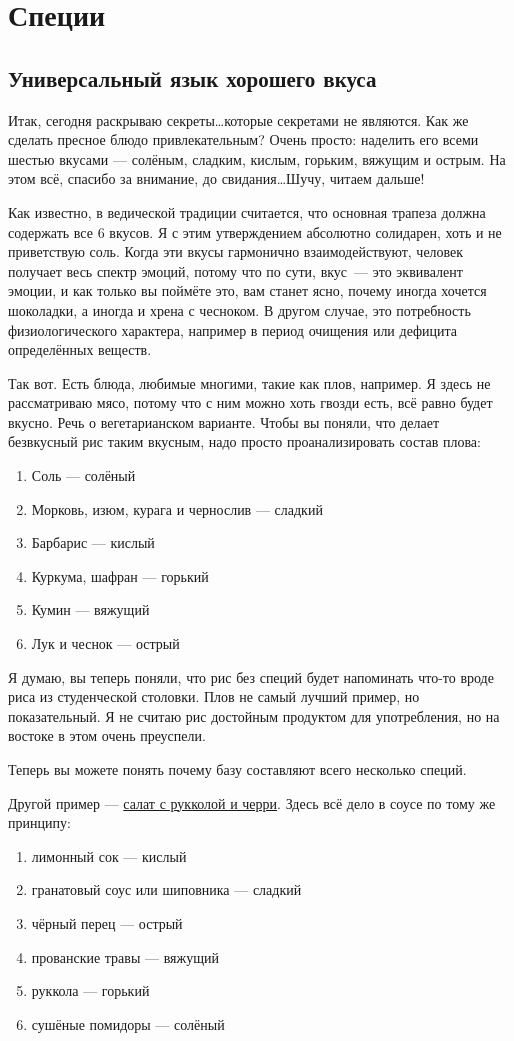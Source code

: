 \chapter{Специи}
\section{Универсальный язык хорошего вкуса}

Итак, сегодня раскрываю секреты\ldots которые секретами не являются.
Как же сделать пресное блюдо привлекательным? 
Очень просто: наделить его всеми шестью вкусами — солёным, сладким, кислым, горьким, вяжущим и острым. На этом всё, спасибо за внимание, до свидания\ldots Шучу, читаем дальше!

Как известно, в ведической традиции считается, что основная трапеза должна содержать все 6 вкусов. Я с этим утверждением абсолютно солидарен, хоть и не приветствую соль. Когда эти вкусы гармонично взаимодействуют, человек получает весь спектр эмоций, потому что по сути, вкус~--- это эквивалент эмоции, и как только вы поймёте это, вам станет ясно, почему иногда хочется шоколадки, а иногда и хрена с чесноком. В другом случае, это потребность физиологического характера, например в период очищения или дефицита определённых веществ.

Так вот. Есть блюда, любимые многими, такие как плов, например. Я здесь не рассматриваю мясо, потому что с ним можно хоть гвозди есть, всё равно будет вкусно. Речь о вегетарианском варианте. Чтобы вы поняли, что делает безвкусный рис таким вкусным, надо просто проанализировать состав плова:
\begin{enumerate}
\item Соль — солёный
\item Морковь, изюм, курага и чернослив — сладкий
\item Барбарис — кислый
\item Куркума, шафран — горький
\item Кумин — вяжущий
\item Лук и чеснок — острый
\end{enumerate}

Я думаю, вы теперь поняли, что рис без специй будет напоминать что-то вроде риса из студенческой столовки. Плов не самый лучший пример, но показательный. Я не считаю рис достойным продуктом для употребления, но на востоке в этом очень преуспели.

Теперь вы можете понять почему базу составляют всего несколько специй.

Другой пример — \hyperref[arugula]{салат с рукколой и черри}. Здесь всё дело в соусе по тому же принципу:
\begin{enumerate}
\item лимонный сок — кислый
\item гранатовый соус или шиповника — сладкий
\item чёрный перец — острый
\item прованские травы — вяжущий
 
\item руккола — горький
\item сушёные помидоры — солёный
\end{enumerate}


